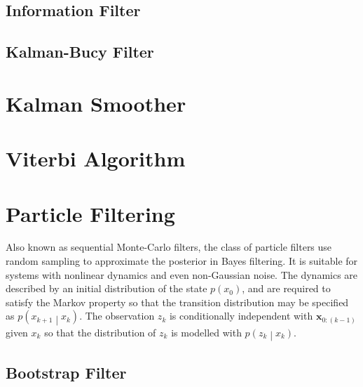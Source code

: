 \documentclass[11pt]{report} %
\begin{document}
\subsection{Information Filter}

\subsection{Kalman-Bucy Filter}

\section{Kalman Smoother}

\section{Viterbi Algorithm}

\section{Particle Filtering}

Also known as sequential Monte-Carlo filters, the class of particle filters use random sampling to approximate the posterior in Bayes filtering. It is suitable for systems with nonlinear dynamics and even non-Gaussian noise. The dynamics are described by an initial distribution of the state $p\left(x_{0}\right)$, and are required to satisfy the Markov property so that the transition distribution may be specified as $p\left(x_{k + 1}\middle|x_{k}\right)$. The observation $z_{k}$ is conditionally independent with $\mathbf{x}_{0:\left(k - 1\right)}$ given $x_{k}$ so that the distribution of $z_{k}$ is modelled with $p\left(z_{k}\middle|x_{k}\right)$.

\subsection{Bootstrap Filter \cite{Doucet2001a}}
\end{document}
